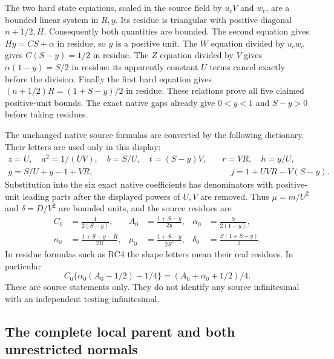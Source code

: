 The two hard state equations, scaled in the source field by
$u_cV$ and $w_c$, are a bounded linear system in $R,y$. Its
residue is triangular with positive diagonal $n+1/2,H$.
Consequently both quantities are bounded. The second equation gives
$Hy=CS+\alpha$ in residue, so $y$ is a positive unit. The
$W$ equation divided by $u_cw_c$ gives
$C(S-y)=1/2$ in residue. The $Z$ equation divided by $V$
gives $\alpha(1-y)=S/2$ in residue: its apparently constant
$U$ terms cancel exactly before the division. Finally the first
hard equation gives $(n+1/2)R=(1+S-y)/2$ in residue. These
relations prove all five claimed positive-unit bounds. The exact
native gaps already give $0<y<1$ and $S-y>0$ before taking
residues.

The unchanged native source formulas are converted by the following
dictionary. Their letters are used only in this display:
\[
\begin{aligned}
 z=U,\quad a^2=1/(UV),\quad b=S/U,\quad t=(S-y)V,
 &\quad r=VR,\quad h=y/U,\\
 g=S/U+y-1+VR,&\qquad j=1+UVR-V(S-y).
\end{aligned}
 \tag{RC3}
\]
Substitution into the six exact native coefficients has denominators
with positive-unit leading parts after the displayed powers of
$U,V$ are removed. Thus $\mu=m/U^2$ and $\delta=D/V^2$
are bounded units, and the source residues are
\[
\begin{aligned}
 C_0&=\frac1{2(S-y)},& A_0&=\frac{1+S-y}{2y},&
 \alpha_0&=\frac{S}{2(1-y)},\\
 n_0&=\frac{1+S-y-R}{2R},&
 \mu_0&=\frac{1+S-y}{2S^2},&
 \delta_0&=\frac{S(1+S-y)}2.
\end{aligned}\tag{RC4}
\]
In residue formulas such as RC4 the shape letters mean their real
residues. In particular
\[
 C_0\{\alpha_0(A_0-1/2)-1/4\}
       =(A_0+\alpha_0+1/2)/4.
 \tag{RC5}
\]
These are source statements only. They do not identify any source
infinitesimal with an independent testing infinitesimal.

\subsection{The complete local parent and both unrestricted normals}

